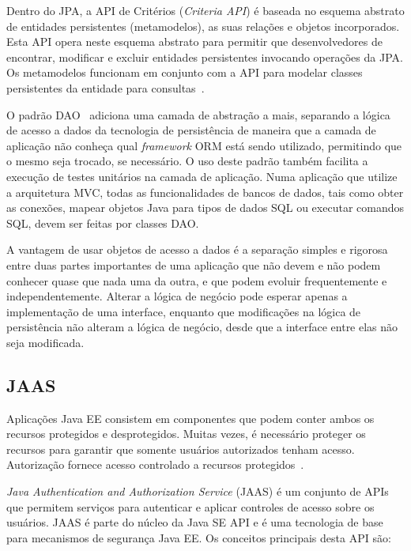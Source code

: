 Dentro do JPA, a API de Critérios (\textit{Criteria API}) é baseada no esquema abstrato de entidades persistentes (metamodelos), as suas relações e objetos incorporados. Esta API opera neste esquema abstrato para permitir que desenvolvedores de encontrar, modificar e excluir entidades persistentes invocando operações da JPA. Os metamodelos funcionam em conjunto com a API para modelar classes persistentes da entidade para consultas~\cite{oracleJAAS}.

O padrão DAO~\cite{alurDAO} adiciona uma camada de abstração a mais, separando a lógica de acesso a dados da tecnologia de persistência de maneira que a camada de aplicação não conheça qual \textit{framework} ORM está sendo utilizado, permitindo que o mesmo seja trocado, se necessário. O uso deste padrão também facilita a execução de testes unitários na camada de aplicação. 
Numa aplicação que utilize a arquitetura MVC, todas as funcionalidades de bancos de dados, tais como obter as conexões, mapear objetos Java para tipos de dados SQL ou executar comandos SQL, devem ser feitas por classes DAO. 

A vantagem de usar objetos de acesso a dados é a separação simples e rigorosa entre duas partes importantes de uma aplicação que não devem e não podem conhecer quase que nada uma da outra, e que podem evoluir frequentemente e independentemente. Alterar a lógica de negócio pode esperar apenas a implementação de uma interface, enquanto que modificações na lógica de persistência não alteram a lógica de negócio, desde que a interface entre elas não seja modificada. 




\subsection{JAAS}

Aplicações Java EE consistem em componentes que podem conter ambos os recursos protegidos e desprotegidos. Muitas vezes, é necessário proteger os recursos para garantir que somente usuários autorizados tenham acesso. Autorização fornece acesso controlado a recursos protegidos~\cite{oracleJAAS}.

\textit{Java Authentication and Authorization Service} (JAAS) é um conjunto de APIs que permitem serviços para autenticar e aplicar controles de acesso sobre os usuários. JAAS é parte do núcleo da Java SE API e é uma tecnologia de base para mecanismos de segurança Java EE. Os conceitos principais desta API são:


